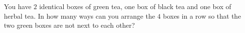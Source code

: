You have $2$ identical boxes of green tea, one box of black tea and one box of herbal tea. In how many ways can you arrange the $4$ boxes in a row so that the two green boxes are not next to each other?
